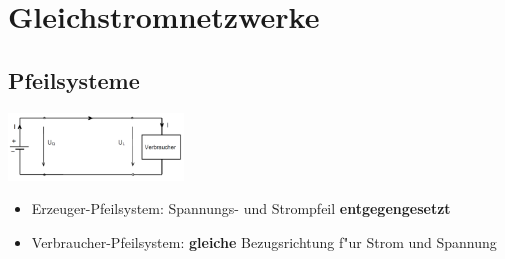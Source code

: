 \section{Gleichstromnetzwerke}

\subsection{Pfeilsysteme}
\begin{multicols}{3}
\includegraphics[width=0.35\textwidth]{pics/dcnet/pfeilsysteme}\\
\begin{itemize}
	\item Erzeuger-Pfeilsystem: Spannungs- und Strompfeil \textbf{entgegengesetzt}
	\item Verbraucher-Pfeilsystem: \textbf{gleiche} Bezugsrichtung f"ur Strom und Spannung
\end{itemize}
\end{multicols}
